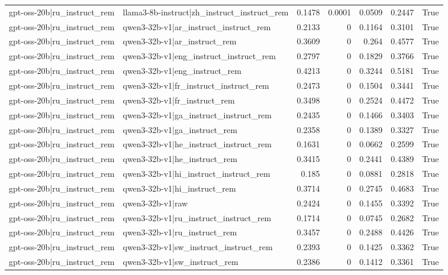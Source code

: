 \begin{table}
\begin{tabular}{l l r r r r l}
gpt-oss-20b|ru_instruct_rem & llama3-8b-instruct|zh_instruct_instruct_rem & 0.1478 & 0.0001 & 0.0509 & 0.2447 & True \\
gpt-oss-20b|ru_instruct_rem & qwen3-32b-v1|ar_instruct_instruct_rem & 0.2133 & 0 & 0.1164 & 0.3101 & True \\
gpt-oss-20b|ru_instruct_rem & qwen3-32b-v1|ar_instruct_rem & 0.3609 & 0 & 0.264 & 0.4577 & True \\
gpt-oss-20b|ru_instruct_rem & qwen3-32b-v1|eng_instruct_instruct_rem & 0.2797 & 0 & 0.1829 & 0.3766 & True \\
gpt-oss-20b|ru_instruct_rem & qwen3-32b-v1|eng_instruct_rem & 0.4213 & 0 & 0.3244 & 0.5181 & True \\
gpt-oss-20b|ru_instruct_rem & qwen3-32b-v1|fr_instruct_instruct_rem & 0.2473 & 0 & 0.1504 & 0.3441 & True \\
gpt-oss-20b|ru_instruct_rem & qwen3-32b-v1|fr_instruct_rem & 0.3498 & 0 & 0.2524 & 0.4472 & True \\
gpt-oss-20b|ru_instruct_rem & qwen3-32b-v1|ga_instruct_instruct_rem & 0.2435 & 0 & 0.1466 & 0.3403 & True \\
gpt-oss-20b|ru_instruct_rem & qwen3-32b-v1|ga_instruct_rem & 0.2358 & 0 & 0.1389 & 0.3327 & True \\
gpt-oss-20b|ru_instruct_rem & qwen3-32b-v1|he_instruct_instruct_rem & 0.1631 & 0 & 0.0662 & 0.2599 & True \\
gpt-oss-20b|ru_instruct_rem & qwen3-32b-v1|he_instruct_rem & 0.3415 & 0 & 0.2441 & 0.4389 & True \\
gpt-oss-20b|ru_instruct_rem & qwen3-32b-v1|hi_instruct_instruct_rem & 0.185 & 0 & 0.0881 & 0.2818 & True \\
gpt-oss-20b|ru_instruct_rem & qwen3-32b-v1|hi_instruct_rem & 0.3714 & 0 & 0.2745 & 0.4683 & True \\
gpt-oss-20b|ru_instruct_rem & qwen3-32b-v1|raw & 0.2424 & 0 & 0.1455 & 0.3392 & True \\
gpt-oss-20b|ru_instruct_rem & qwen3-32b-v1|ru_instruct_instruct_rem & 0.1714 & 0 & 0.0745 & 0.2682 & True \\
gpt-oss-20b|ru_instruct_rem & qwen3-32b-v1|ru_instruct_rem & 0.3457 & 0 & 0.2488 & 0.4426 & True \\
gpt-oss-20b|ru_instruct_rem & qwen3-32b-v1|sw_instruct_instruct_rem & 0.2393 & 0 & 0.1425 & 0.3362 & True \\
gpt-oss-20b|ru_instruct_rem & qwen3-32b-v1|sw_instruct_rem & 0.2386 & 0 & 0.1412 & 0.3361 & True \\

\end{tabular}
\end{table}
